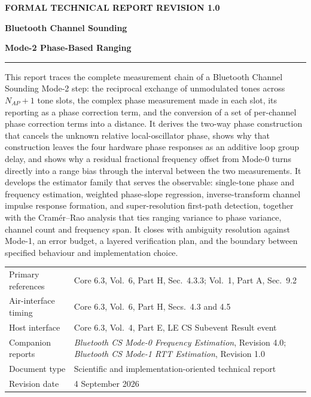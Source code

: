 \documentclass[11pt,a4paper]{article}
\newcommand{\Nap}{N_{AP}}
\begin{document}
\thispagestyle{empty}
\vspace*{18mm}
{\color{accent}\small\bfseries FORMAL TECHNICAL REPORT \hfill REVISION 1.0}

\vspace{26mm}
{\raggedright\color{navy}\Huge\bfseries Bluetooth Channel Sounding\par}
\vspace{5mm}
{\raggedright\color{navy}\huge\bfseries Mode-2 Phase-Based Ranging\par}

\vspace{7mm}

\vspace{12mm}
\noindent\rule{\textwidth}{1pt}

\vspace{4mm}
\noindent
This report traces the complete measurement chain of a Bluetooth Channel Sounding Mode-2 step: the
reciprocal exchange of unmodulated tones across $\Nap+1$ tone slots, the complex phase measurement
made in each slot, its reporting as a phase correction term, and the conversion of a set of
per-channel phase correction terms into a distance. It derives the two-way phase construction that
cancels the unknown relative local-oscillator phase, shows why that construction leaves the four
hardware phase responses as an additive loop group delay, and shows why a residual fractional
frequency offset from Mode-0 turns directly into a range bias through the interval between the two
measurements. It develops the estimator family that serves the observable: single-tone phase and
frequency estimation, weighted phase-slope regression, inverse-transform channel impulse response
formation, and super-resolution first-path detection, together with the Cram\'er--Rao analysis that
ties ranging variance to phase variance, channel count and frequency span. It closes with
ambiguity resolution against Mode-1, an error budget, a layered verification plan, and the boundary
between specified behaviour and implementation choice.

\vfill
\noindent
\begin{tabular}{@{}L{40mm}L{95mm}@{}}
Primary references & Core 6.3, Vol.\ 6, Part H, Sec.\ 4.3.3; Vol.\ 1, Part A, Sec.\ 9.2 \\
Air-interface timing & Core 6.3, Vol.\ 6, Part H, Secs.\ 4.3 and 4.5 \\
Host interface & Core 6.3, Vol.\ 4, Part E, LE CS Subevent Result event \\
Companion reports & \emph{Bluetooth CS Mode-0 Frequency Estimation}, Revision 4.0;
                    \emph{Bluetooth CS Mode-1 RTT Estimation}, Revision 1.0 \\
Document type & Scientific and implementation-oriented technical report \\
Revision date & 4 September 2026 \\
\end{tabular}
\end{document}
